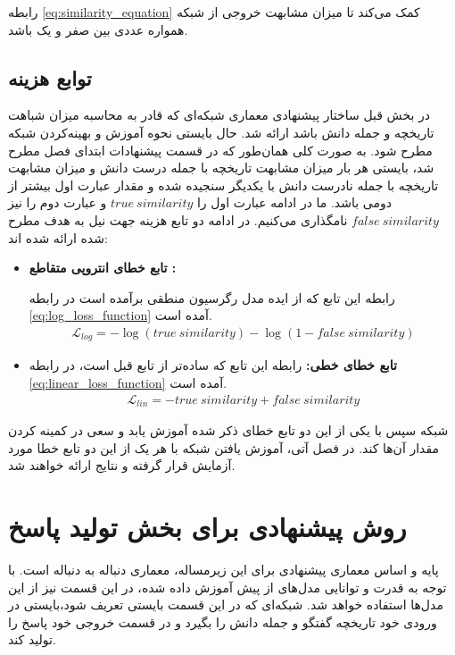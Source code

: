 رابطه 
\ref{eq:similarity_equation}
کمک می‌کند تا میزان مشابهت خروجی از شبکه همواره عددی بین صفر و یک باشد. 

\subsection{توابع هزینه}
در بخش قبل ساختار پیشنهادی معماری شبکه‌ای که قادر به محاسبه میزان شباهت تاریخچه و جمله دانش باشد ارائه شد. حال بایستی نحوه آموزش و بهینه‌کردن شبکه مطرح شود. به صورت کلی همان‌طور که در قسمت پیشنهادات ابتدای فصل مطرح شد، بایستی هر بار میزان مشابهت تاریخچه با جمله درست دانش و میزان مشابهت تاریخچه با جمله نادرست دانش با یکدیگر سنجیده شده و مقدار عبارت اول بیشتر از دومی باشد. ما در ادامه عبارت اول را 
$true\:similarity$
و عبارت دوم را نیز
$false\:similarity$
نامگذاری می‌کنیم. در ادامه دو تابع هزینه جهت نیل به هدف مطرح شده ارائه شده اند:

\begin{itemize}
	\item 
	\textbf{
	تابع خطای انتروپی متقاطع 
	:
	}

	رابطه این تابع که از ایده مدل رگرسیون منطقی برآمده است در رابطه
	\ref{eq:log_loss_function}
	آمده است. 
\begin{gather}\label{eq:log_loss_function}
\mathcal{L}_{log} = -\log{(true\:similarity)} -  \log{(1-false\:similarity)} 
\end{gather}


	\item
	\textbf{
	تابع خطای خطی:
	}
رابطه این تابع که ساده‌تر از تابع قبل است، در رابطه 
\ref{eq:linear_loss_function}
آمده است.
\begin{gather}\label{eq:linear_loss_function}
\mathcal{L}_{lin} = -true\:similarity + false\:similarity 
\end{gather}


\end{itemize}

شبکه سپس با یکی از این دو تابع خطای ذکر شده آموزش یابد و سعی در کمینه کردن مقدار آن‌ها کند. در فصل آتی، آموزش یافتن شبکه با هر یک از این دو تابع خطا مورد آزمایش قرار گرفته و نتایج ارائه خواهند شد.

\section{روش پیشنهادی برای بخش تولید پاسخ}

پایه و اساس معماری پیشنهادی برای این زیرمساله، معماری دنباله به دنباله است. با توجه به قدرت و توانایی مدل‌های از پیش آموزش داده شده، در این قسمت نیز از این مدل‌ها استفاده خواهد شد.
شبکه‌ای که در این قسمت بایستی تعریف شود،‌بایستی در ورودی خود تاریخچه گفتگو و جمله دانش را بگیرد و در قسمت خروجی خود پاسخ را تولید کند. 
